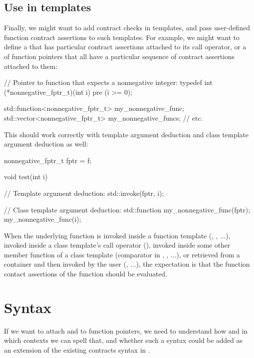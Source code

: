 \subsection{Use in templates}
\label{usecase_templates}
Finally, we might want to add contract checks in templates, and pass user-defined function contract assertions to such templates. For example, we might want to define a  that has particular contract assertions attached to its call operator, or a  of function pointers that all have a particular sequence of contract assertions attached to them:
\begin{codeblock}
// Pointer to function that expects a nonnegative integer:
typedef int (*nonnegative_fptr_t)(int i) pre (i >= 0);

std::function<nonnegative_fptr_t> my_nonnegative_func;
std::vector<nonnegative_fptr_t>   my_nonnegative_funcs;
// etc.
\end{codeblock}
This should work correctly with template argument deduction and class template argument deduction as well:
\begin{codeblock}
nonnegative_fptr_t fptr = f;

void test(int i) {
  // Template argument deduction:
  std::invoke(fptr, i);
  
  // Class template argument deduction:
  std::function my_nonnegative_func(fptr);
  my_nonnegative_func(i);
}
\end{codeblock}
When the underlying function is invoked inside a function template (, , ...), invoked inside a class template's call operator (), invoked inside some other member function of a class template (comparator in , , ...), or retrieved from a container and then invoked by the user (, ...), the expectation is that the function contact assertions of the function should be evaluated.



\section{Syntax}
\label{syntax}

If we want to attach  and  to function pointers, we need to understand how and in which contexts we can spell that, and whether such a syntax could be added as an extension of the existing contracts syntax in \cite{P2900R8}.

